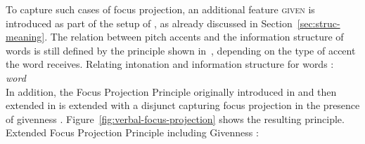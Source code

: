 \documentclass[output=paper
 	        ,biblatex
                ,babelshorthands
                ,newtxmath
                ,draftmode
                ,colorlinks, citecolor=brown
]{langscibook}
\begin{document}
To capture such cases of focus projection, an additional feature
\textsc{given} is introduced as part of the setup of
\cite{deKuthy2002a}, as already discussed in Section~\ref{sec:struc-meaning}. The
relation between pitch accents and the information structure of words
is still defined by the principle shown in~,
depending on the type of accent the word receives.
\ea
Relating intonation and information structure for words \citep{DeKuthy.Meurers-11}:\\
    \emph{word}\quad \impl \\
    \label{fig:words2}
\z
In addition, the Focus Projection Principle originally introduced in \cite{deKuthy2002a} and then extended in \cite{dKM2003a} is extended with a disjunct capturing focus
projection in the presence of givenness \citep{DeKuthy.Meurers-11}. Figure~\ref{fig:verbal-focus-projection} shows the resulting principle.
\ea
Extended Focus Projection Principle including Givenness \citep{DeKuthy.Meurers-11}:\\
\end{document}
